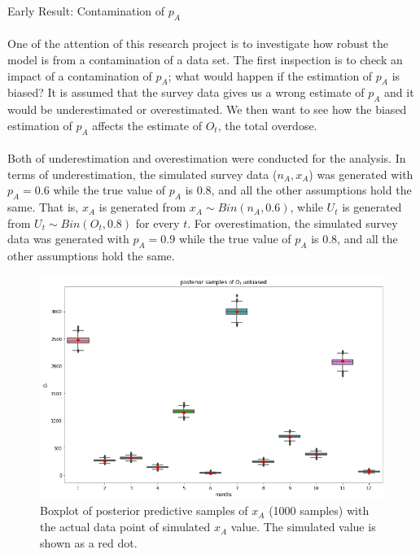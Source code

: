 \documentclass[
10pt, %
a4paper, %
oneside, %
headinclude,footinclude, %
BCOR5mm, %
]{scrartcl}
\begin{document}
\Large Early Result: Contamination of $p_A$ \\
\normalsize \\
One of the attention of this research project is to investigate how robust the model is from a contamination of a data set. The first inspection is to check an impact of a contamination of $p_A$; what would happen if the estimation of $p_A$ is biased? It is assumed that the survey data gives us a wrong estimate of $p_A$ and it would be underestimated or overestimated. We then want to see how the biased estimation of $p_A$ affects the estimate of $O_t$, the total overdose.\\
\normalsize\\
Both of underestimation and overestimation were conducted for the analysis. In terms of underestimation, the simulated survey data ($n_A, x_A$) was generated with $p_A=0.6$ while the true value of $p_A$ is 0.8, and all the other assumptions hold the same. That is, $x_A$ is generated from $x_A \sim Bin(n_A, 0.6)$, while $U_t$ is generated from $U_t \sim Bin(O_t, 0.8)$ for every $t$. For overestimation, the simulated survey data was generated with $p_A=0.9$ while the true value of $p_A$ is 0.8, and all the other assumptions hold the same. 

\begin{figure}[htb]
	\centering
	\includegraphics[width=1\linewidth]{Figures/early_contamination_ot.png}
	\caption{Boxplot of posterior predictive samples of $x_A$ (1000 samples) with the actual data point of simulated $x_A$ value. The simulated value is shown as a red dot.}
	\label{ppc_xt}
\end{figure}
\end{document}
